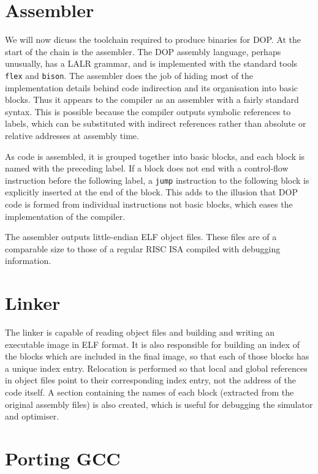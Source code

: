 \documentclass[11pt,letterpaper,twocolumn,notitlepage]{article}
\begin{document}
\section{Assembler}

We will now dicuss the toolchain required to produce binaries for DOP. At the start of the chain is the assembler. The DOP assembly language, perhaps unusually, has a LALR grammar, and is implemented with the standard tools {\tt flex} and {\tt bison}. The assembler does the job of hiding most of the implementation details behind code indirection and its organisation into basic blocks. Thus it appears to the compiler as an assembler with a fairly standard syntax. This is possible because the compiler outputs symbolic references to labels, which can be substituted with indirect references rather than absolute or relative addresses at assembly time.

As code is assembled, it is grouped together into basic blocks, and each block is named with the preceding label. If a block does not end with a control-flow instruction before the following label, a {\tt jump} instruction to the following block is explicitly inserted at the end of the block. This adds to the illusion that DOP code is formed from individual instructions not basic blocks, which eases the implementation of the compiler.

The assembler outputs little-endian ELF object files. These files are of a comparable size to those of a regular RISC ISA compiled with debugging information.

\section{Linker}

The linker is capable of reading object files and building and writing an executable image in ELF format. It is also responsible for building an index of the blocks which are included in the final image, so that each of those blocks has a unique index entry. Relocation is performed so that local and global references in object files point to their corresponding index entry, not the address of the code itself. A section containing the names of each block (extracted from the original assembly files) is also created, which is useful for debugging the simulator and optimiser.

\section{Porting GCC}
\end{document}
